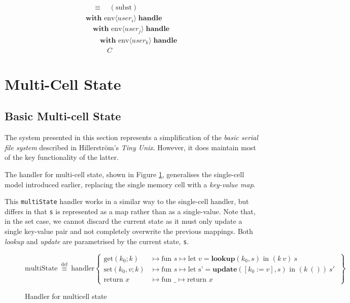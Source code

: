 \documentclass[logo,bsc,singlespacing,parskip]{infthesis}
\begin{document}
\[\begin{array}{l}
\quad\equiv\quad (\text{subst}) \\[5pt]
\textbf{with }\text{env} \langle \mathit{user}_i \rangle\; \textbf{handle} \\
\quad\textbf{with }\text{env} \langle \mathit{user}_j \rangle\; \textbf{handle} \\
\qquad\textbf{with }\text{env} \langle \mathit{user}_k \rangle\; \textbf{handle}\; \\
\quad\quad\quad C
\end{array}
\]



\section{Multi-Cell State}


\subsection{Basic Multi-cell State}

The system presented in this section represents a  simplification of the \textit{basic serial file system} described in Hillerström's \textit{Tiny Unix}. However, it does maintain most of the key functionality of the latter. 

The handler for multi-cell state, shown in Figure \ref{fig:multicell-handler}, generalises the single-cell model introduced earlier, replacing the single memory cell with a \textit{key-value map}. 

This \lstinline{multiState} handler works in a similar way to the single-cell handler, but differs in that \lstinline{s} is represented as a map rather than as a single-value. Note that, in the set case, we cannot discard the current state as it must only update a single key-value pair and not completely overwrite the previous mappings. Both \textit{lookup} and \textit{update} are parametrised by the current state, \lstinline{s}.

\begin{figure}[H]
\centering
\[
\text{multiState}\ \overset{\text{def}}{\equiv} \ \text{handler} \left\{
\begin{array}{ll}
\text{get}(k_0; k) &\mapsto \text{fun } s \mapsto \text{let } v = \textbf{lookup}(k_0, s) \text{ in } (k\ v)\ s \\
\text{set}(k_0, v; k) &\mapsto \text{fun } s \mapsto \text{let s'} = \textbf{update}([k_0:=v],s) \text{ in } (k\ ())\ s'\ \\
\text{return } x &\mapsto \text{fun } \_ \mapsto \text{return } x
\end{array}
\right\}
\]
\caption{Handler for multicell state}
\label{fig:multicell-handler}
\end{figure}
\end{document}
